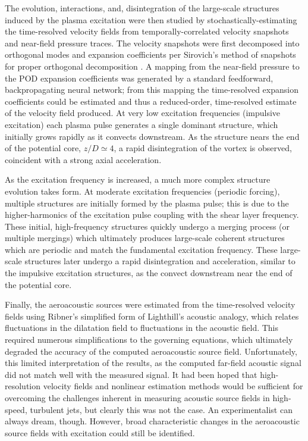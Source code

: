 The evolution, interactions, and, disintegration of the large-scale structures induced by the plasma excitation were then studied by stochastically-estimating the time-resolved velocity fields from temporally-correlated velocity snapshots and near-field pressure traces.
The velocity snapshots were first decomposed into orthogonal modes and expansion coefficients per Sirovich's method of snapshots for proper orthogonal decomposition \citep{Sirovich1987}.
A mapping from the near-field pressure to the POD expansion coefficients was generated by a standard feedforward, backpropagating neural network; from this mapping the time-resolved expansion coefficients could be estimated and thus a reduced-order, time-resolved estimate of the velocity field produced.
At very low excitation frequencies (impulsive excitation) each plasma pulse generates a single dominant structure, which initially grows rapidly as it convects downstream. 
As the structure nears the end of the potential core, $z/D \simeq 4$, a rapid disintegration of the vortex is observed, coincident with a strong axial acceleration.

As the excitation frequency is increased, a much more complex structure evolution takes form.
At moderate excitation frequencies (periodic forcing), multiple structures are initially formed by the plasma pulse; this is due to the higher-harmonics of the excitation pulse coupling with the shear layer frequency.
These initial, high-frequency structures quickly undergo a merging process (or multiple mergings) which ultimately produces large-scale coherent structures which are periodic and match the fundamental excitation frequency.
These large-scale structures later undergo a rapid disintegration and acceleration, similar to the impulsive excitation structures, as the convect downstream near the end of the potential core. 

Finally, the aeroacoustic sources were estimated from the time-resolved velocity fields using Ribner's simplified form of Lighthill's acoustic analogy, which relates fluctuations in the dilatation field to fluctuations in the acoustic field.
This required numerous simplifications to the governing equations, which ultimately degraded the accuracy of the computed aeroacoustic source field.
Unfortunately, this limited interpretation of the results, as the computed far-field acoustic signal did not match well with the measured signal.
It had been hoped that high-resolution velocity fields and nonlinear estimation methods would be sufficient for overcoming the challenges inherent in measuring acoustic source fields in high-speed, turbulent jets, but clearly this was not the case. 
An experimentalist can always dream, though.
However, broad characteristic changes in the aeroacoustic source fields with excitation could still be identified.

